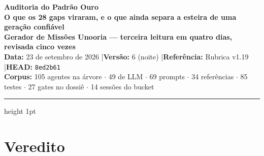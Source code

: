 \documentclass[11pt,a4paper]{article}
\begin{document}
\begin{center}
    {\Huge\bfseries\color{NavyBlue} Auditoria do Padrão Ouro}\\[0.4cm]
    {\LARGE\bfseries\color{SteelBlue} O que os 28 gaps viraram, e o que ainda separa a esteira de uma geração confiável}\\[0.5cm]
    \textbf{Gerador de Missões Unooria --- terceira leitura em quatro dias, revisada cinco vezes}\\[0.3cm]
    {\small \textbf{Data:} 23 de setembro de 2026 \quad|\quad \textbf{Versão:} 6 (noite) \quad|\quad \textbf{Referência:} Rubrica v1.19 \quad|\quad \textbf{HEAD:} \texttt{8ed2b61}}\\[0.2cm]
    {\footnotesize \textbf{Corpus:} 105 agentes na árvore $\cdot$ 49 de LLM $\cdot$ 69 prompts $\cdot$ 34 referências $\cdot$ 85 testes $\cdot$ 27 gates no dossiê $\cdot$ 14 sessões do bucket}
\end{center}

\vspace{0.4cm}
\hrule height 1pt
\vspace{0.5cm}

\section{Veredito}
\end{document}
